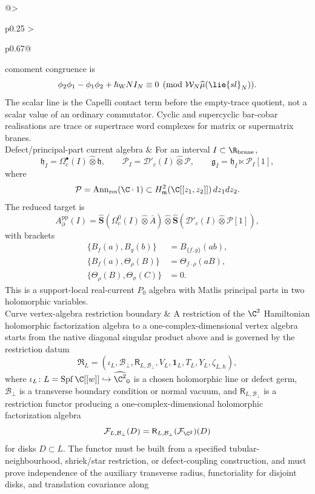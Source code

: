 \begin{longtable}{@{}>{\raggedright\arraybackslash}p{}
  >{\raggedright\arraybackslash}p{}@{}}
comoment congruence is
\[
  \phi_2\phi_1-\phi_1\phi_2+\hbar_{\mathrm{W}}N I_N\equiv0
  \pmod{\mathcal W_N\widehat\mu(\lie{sl}_N)}.
\]
The scalar line is the Capelli contact term before the empty-trace
quotient, not a scalar value of an ordinary commutator.  Cyclic and
supercyclic bar-cobar realisations are trace or supertrace word
complexes for matrix or supermatrix branes.\\
\hline
Defect/principal-part current algebra &
For an interval \(I\subset\R_{\mathrm{brane}}\),
\[
  \mathfrak h_I=\Omega^\bullet_c(I)\widehat\otimes\mathfrak h,\qquad
  \mathcal P_I=\mathcal D'_c(I)\widehat\otimes\mathcal P,\qquad
  \mathfrak g_I=\mathfrak h_I\ltimes\mathcal P_I[1],
\]
where
\[
  \mathcal P=\operatorname{Ann}_{\mathrm{res}}(\C\cdot1)
  \subset H^2_{\mathfrak m}(\C[[z_1,z_2]])\,dz_1dz_2 .
\]
The reduced target is
\[
  A^{\mathrm{pp}}_\partial(I)=
  \widehat{\mathbf S}(\Omega_c^0(I)\widehat\otimes\bar A)
  \widehat\otimes
  \widehat{\mathbf S}(\mathcal D'_c(I)\widehat\otimes\mathcal P[1]),
\]
with brackets
\[
  \begin{aligned}
  \{B_f(a),B_g(b)\}&=B_{\{f,g\}}(ab),\\
  \{B_f(a),\Theta_\rho(B)\}&=\Theta_{f\cdot\rho}(aB),\\
  \{\Theta_\rho(B),\Theta_\sigma(C)\}&=0 .
  \end{aligned}
\]
This is a support-local real-current \(P_0\) algebra with Matlis
principal parts in two holomorphic variables.\\
\hline
Curve vertex-algebra restriction boundary &
A restriction of the \(\C^2\) Hamiltonian holomorphic
factorization algebra to a one-complex-dimensional vertex algebra
starts from the native diagonal singular product above and is governed by
the restriction datum
\[
  \mathfrak R_L
  =
  (\iota_L,\mathcal B_\perp,\mathsf R_{L,\mathcal B_\perp},
   V_L,\mathbf 1_L,T_L,Y_L,\zeta_{L,\hbar}),
\]
where
\(\iota_L\colon L=\operatorname{Spf}\C[[w]]
\hookrightarrow\widehat{\C^2}_0\) is a chosen holomorphic line or defect
germ, \(\mathcal B_\perp\) is a transverse boundary condition or normal
vacuum, and \(\mathsf R_{L,\mathcal B_\perp}\) is a restriction functor
producing a
one-complex-dimensional holomorphic factorization algebra
\[
  \mathcal F_{L,\mathcal B_\perp}(D)
  =
  \mathsf R_{L,\mathcal B_\perp}(\mathcal F_{\C^2})(D)
\]
for disks \(D\subset L\).  The functor must be built from a specified
tubular-neighbourhood, shriek/star restriction, or defect-coupling
construction, and must prove independence of the auxiliary transverse
radius, functoriality for disjoint disks, and translation covariance along

\end{longtable}
